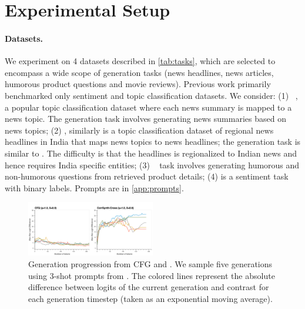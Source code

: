 \section{Experimental Setup}
\label{sec:expt-setup}




\paragraph{Datasets.}  We experiment on 4 datasets described in \autoref{tab:tasks}, which are selected to encompass a wide scope of generation tasks (news headlines, news articles, humorous product questions and movie reviews). Previous work primarily benchmarked only sentiment and topic classification datasets. We consider: (1) \AGNews{}~\citep{zhang2015character}, a popular topic classification dataset where each news summary is mapped to a news topic. The generation task involves generating news summaries based on news topics; (2) \ToIHeadlines{}\cite{toiheadlines}, similarly is a topic classification dataset of regional news headlines in India that maps news topics to news headlines; the generation task is similar to \AGNews{}. The difficulty is that the headlines is regionalized to Indian news and hence requires India specific entities; (3) \Humor~\citep{humor} task involves generating humorous and non-humorous questions from retrieved product details; (4) \IMDb{} \cite{maas-etal-2011-learning} is a sentiment task with binary labels. Prompts are in \autoref{app:prompts}.





\begin{figure}[!t]
\centering
\includegraphics[width=0.5\textwidth]{figure/cfg_vs_corr.png}
\vspace{-0.8cm}
\caption{Generation progression from CFG and \corrsyn. We sample five generations using 3-shot prompts from \IMDb. The colored lines represent the absolute difference between logits of the current generation and contrast for each generation timestep (taken as an exponential moving average).}
\vspace{-1em}
\label{fig:cfg_vs_corrsynth}
\end{figure}


